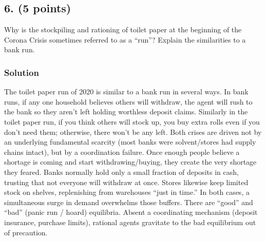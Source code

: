 \documentclass[12pt]{article}
\begin{document}
\subsection*{6. (5 points)}

Why is the stockpiling and rationing of toilet paper at the beginning of the Corona Crisis sometimes referred to as a “run”? Explain the similarities to a bank run.
\subsubsection*{Solution}

The toilet paper run of 2020 is similar to a bank run in several ways. 
In bank runs, if any one household believes others will withdraw, the agent will rush to the bank so they aren’t left holding worthless deposit claims.
Similarly in the toilet paper run, if you think others will stock up, you buy extra rolls even if you don’t need them; otherwise, there won’t be any left.
Both crises are driven not by an underlying fundamental scarcity (most banks were solvent/stores had supply chains intact), but by a coordination failure. Once enough people believe a shortage is coming and start withdrawing/buying, they create the very shortage they feared.
Banks normally hold only a small fraction of deposits in cash, trusting that not everyone will withdraw at once. Stores likewise keep limited stock on shelves, replenishing from warehouses “just in time.” In both cases, a simultaneous surge in demand overwhelms those buffers.
There are “good” and “bad”  (panic run / hoard) equilibria. Absent a coordinating mechanism (deposit insurance, purchase limits), rational agents gravitate to the bad equilibrium out of precaution.
\end{document}
